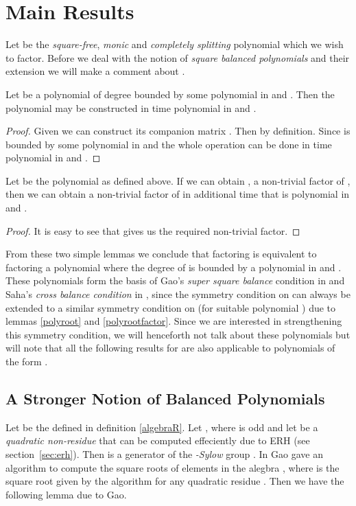 \chapter{Main Results}

Let  be the \emph{square-free}, \emph{monic} and \emph{completely splitting} polynomial which we wish to factor. Before we deal with the notion of \emph{square balanced polynomials} and
their extension we will make a comment about .

\begin{lemma}\label{polyroot}
	Let  be a polynomial of degree bounded by some polynomial in  and . Then the polynomial  may be constructed in time polynomial in 
	and .
\end{lemma}

\begin{proof}
	Given  we can construct its companion matrix . Then  by definition. Since  is bounded by some polynomial in  and  the whole
	operation can be done in time polynomial in  and .
\end{proof}

\begin{lemma}\label{polyrootfactor}
	Let  be the polynomial as defined above. If we can obtain , a non-trivial factor of , then we can obtain a non-trivial factor of  in additional time that is polynomial in  and .
\end{lemma}

\begin{proof}
	It is easy to see that  gives us the required non-trivial factor.
\end{proof}

From these two simple lemmas we conclude that factoring  is equivalent to factoring a polynomial  where the degree of  is bounded by a polynomial in  and . These polynomials form the basis of Gao's
\emph{super square balance} condition in \cite{gao2001deterministic} and Saha's \emph{cross balance condition} in \cite{saha2008factoring}, since the symmetry condition on  can always be extended to a similar symmetry condition
on  (for suitable polynomial ) due to lemmas \ref{polyroot} and \ref{polyrootfactor}. Since we are interested in strengthening this symmetry condition, we will henceforth not talk about these polynomials but will note that
all the following results for  are also applicable to polynomials of the form .

\section{A Stronger Notion of Balanced Polynomials}\label{sec:stronger}
Let  be the  defined in definition \ref{algebraR}. Let
, where  is odd and let  be a \emph{quadratic non-residue} that can be computed effeciently due to ERH (see section~\ref{sec:erh}). Then  is a generator of the \emph{-Sylow} group .
In \cite{gao2001deterministic} Gao gave an algorithm  to compute the square roots of elements in the alegbra , where  is the square root given by the algorithm for any quadratic residue . Then we have the following lemma due to Gao.

